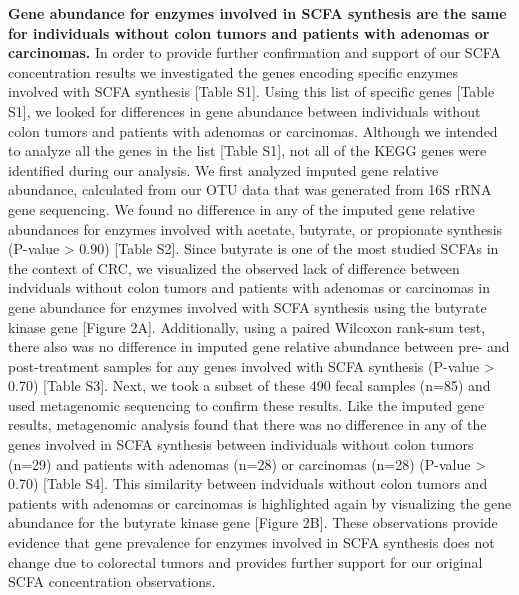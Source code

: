 \documentclass[11pt,]{article}
\begin{document}
\textbf{Gene abundance for enzymes involved in SCFA synthesis are the
same for individuals without colon tumors and patients with adenomas or
carcinomas.} In order to provide further confirmation and support of our
SCFA concentration results we investigated the genes encoding specific
enzymes involved with SCFA synthesis {[}Table S1{]}. Using this list of
specific genes {[}Table S1{]}, we looked for differences in gene
abundance between individuals without colon tumors and patients with
adenomas or carcinomas. Although we intended to analyze all the genes in
the list {[}Table S1{]}, not all of the KEGG genes were identified
during our analysis. We first analyzed imputed gene relative abundance,
calculated from our OTU data that was generated from 16S rRNA gene
sequencing. We found no difference in any of the imputed gene relative
abundances for enzymes involved with acetate, butyrate, or propionate
synthesis (P-value \textgreater{} 0.90) {[}Table S2{]}. Since butyrate
is one of the most studied SCFAs in the context of CRC, we visualized
the observed lack of difference between indviduals without colon tumors
and patients with adenomas or carcinomas in gene abundance for enzymes
involved with SCFA synthesis using the butyrate kinase gene {[}Figure
2A{]}. Additionally, using a paired Wilcoxon rank-sum test, there also
was no difference in imputed gene relative abundance between pre- and
post-treatment samples for any genes involved with SCFA synthesis
(P-value \textgreater{} 0.70) {[}Table S3{]}. Next, we took a subset of
these 490 fecal samples (n=85) and used metagenomic sequencing to
confirm these results. Like the imputed gene results, metagenomic
analysis found that there was no difference in any of the genes involved
in SCFA synthesis between individuals without colon tumors (n=29) and
patients with adenomas (n=28) or carcinomas (n=28) (P-value
\textgreater{} 0.70) {[}Table S4{]}. This similarity between indviduals
without colon tumors and patients with adenomas or carcinomas is
highlighted again by visualizing the gene abundance for the butyrate
kinase gene {[}Figure 2B{]}. These observations provide evidence that
gene prevalence for enzymes involved in SCFA synthesis does not change
due to colorectal tumors and provides further support for our original
SCFA concentration observations.
\end{document}
